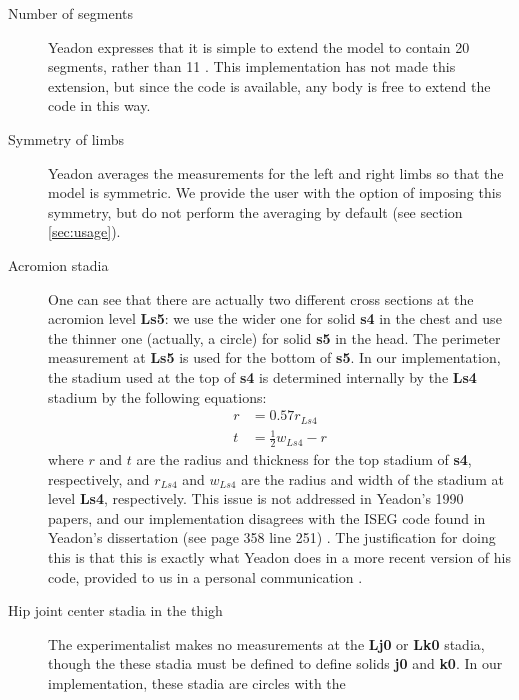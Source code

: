 \documentclass[10pt]{article}
\begin{document}
\begin{description}
    \item[Number of segments] Yeadon expresses that it is simple to extend the
        model to contain 20 segments, rather than 11 \cite{Yeadon1990f}. This
        implementation has not made this extension, but since the code is
        available, any body is free to extend the code in this way.
    \item[Symmetry of limbs] Yeadon averages the measurements for the left and
        right limbs so that the model is symmetric. We provide the user with
        the option of imposing this symmetry, but do not perform the averaging
        by default (see section \ref{sec:usage}).
    \item[Acromion stadia] One can see that there are actually two different
        cross sections at the acromion level \textbf{Ls5}: we use the wider one
        for solid \textbf{s4} in the chest and use the thinner one (actually, a
        circle) for solid \textbf{s5} in the head. The perimeter measurement at
        \textbf{Ls5} is used for the bottom of \textbf{s5}. In our
        implementation, the stadium used at the top of \textbf{s4} is
        determined internally by the \textbf{Ls4} stadium by the following
        equations:
        \begin{align}
            r &= 0.57 r_{Ls4} \\
            t &= \frac{1}{2}w_{Ls4} - r
        \end{align}
        where $r$ and $t$ are the radius and thickness for the top stadium of
        \textbf{s4}, respectively, and $r_{Ls4}$ and $w_{Ls4}$ are the radius
        and width of the stadium at level \textbf{Ls4}, respectively.
        This issue is not addressed in Yeadon's 1990 papers, and our
        implementation disagrees with the ISEG code found in Yeadon's
        dissertation (see page 358 line 251) \cite{Yeadon1984a}. The
        justification for doing this is
        that this is exactly what Yeadon does in a more recent version of his
        code, provided to us in a personal communication .
    \item[Hip joint center stadia in the thigh] The experimentalist makes no
        measurements at the \textbf{Lj0} or \textbf{Lk0} stadia, though the
        these stadia must be defined to define solids \textbf{j0} and
        \textbf{k0}.  In our implementation, these stadia are circles with the

\end{description}
\end{document}
